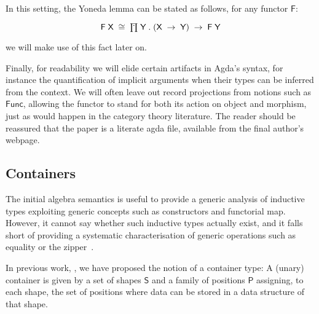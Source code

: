 \documentclass[a4paper]{article}
\makeatletter
\newcommand{\Conid}[1]{\mathit{#1}}
\newcommand{\Varid}[1]{\mathit{#1}}
\newcommand{\anonymous}{\kern0.06em \vbox{\hrule\@width.5em}}
\def\resethooks{%
  \global\let\SaveRestoreHook\empty
  \global\let\ColumnHook\empty}
\newcommand{\hsindent}[1]{\quad}%
\let\hspre\empty
\let\hspost\empty
\renewcommand\Varid[1]{\mathord{\textsf{#1}}}
\let\Conid\Varid
\newcommand\Keyword[1]{\textsf{\textbf{#1}}}
\makeatother
\begin{document}
In this setting, the Yoneda lemma can be stated as follows, for any functor \ensuremath{\Conid{F}}:

\[\mbox{\ensuremath{\Conid{F}\;\Conid{X}\;\cong\;\prodd\;\Conid{Y}\;.\;(\Conid{X}\;\rightarrow\;\Conid{Y})\;\rightarrow\;\Conid{F}\;\Conid{Y}}}\]

we will make use of this fact later on.

Finally, for readability we will elide certain artifacts in Agda's syntax,
for instance the quantification of implicit arguments when their types can be
inferred from the context. We will often leave out record projections 
from notions such as \ensuremath{\Conid{Func}}, allowing the functor to stand for both its action 
on object and morphism, just as would happen in the category theory 
literature. The reader should be reassured that the paper is a
literate agda file, available from the final author's webpage.
 
\subsection{Containers}


The initial algebra semantics is useful to provide a generic
analysis of inductive types exploiting generic concepts such as
constructors and functorial map. However, it cannot say whether such inductive
types actually exist, and it falls short of providing a systematic
characterisation of generic operations such as equality or the
zipper~\cite{huet:zipper,conor:derivative}. 

In previous
work, \cite{alti:cont-tcs,alti:fossacs03}, we have proposed the notion of a container
type: A (unary) container is given by a set of shapes \ensuremath{\Conid{S}} and a
family of positions \ensuremath{\Conid{P}} assigning, to each shape, the set
of positions where data can be stored in a data structure of that
shape.

\resethooks
\end{document}
